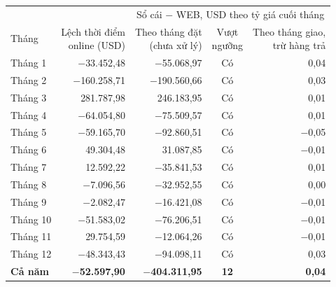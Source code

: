 \begin{tabular}{@{}l r r c r@{}}
\toprule
 & & \multicolumn{3}{c}{Sổ cái $-$ WEB, USD theo tỷ giá cuối tháng} \\
\cmidrule(lr){3-5}
Tháng & \makecell[r]{Lệch thời điểm\\online (USD)} & \makecell[r]{Theo tháng đặt\\(chưa xử lý)} & \makecell[c]{Vượt\\ngưỡng} & \makecell[r]{Theo tháng giao,\\trừ hàng trả} \\
\midrule
Tháng 1 & $-$33.452,48 & $-$55.068,97 & Có & 0,04 \\
Tháng 2 & $-$160.258,71 & $-$190.560,66 & Có & 0,03 \\
Tháng 3 & 281.787,98 & 246.183,95 & Có & 0,01 \\
Tháng 4 & $-$64.054,80 & $-$75.509,57 & Có & 0,01 \\
Tháng 5 & $-$59.165,70 & $-$92.860,51 & Có & $-$0,05 \\
Tháng 6 & 49.304,48 & 31.087,85 & Có & $-$0,01 \\
Tháng 7 & 12.592,22 & $-$35.841,53 & Có & 0,01 \\
Tháng 8 & $-$7.096,56 & $-$32.952,55 & Có & 0,00 \\
Tháng 9 & $-$2.082,47 & $-$16.421,08 & Có & $-$0,01 \\
Tháng 10 & $-$51.583,02 & $-$76.206,51 & Có & $-$0,01 \\
Tháng 11 & 29.754,59 & $-$12.064,26 & Có & $-$0,01 \\
Tháng 12 & $-$48.343,43 & $-$94.098,11 & Có & 0,03 \\
\midrule
\textbf{Cả năm} & \textbf{$-$52.597,90} & \textbf{$-$404.311,95} & \textbf{12} & \textbf{0,04} \\
\bottomrule
\end{tabular}

